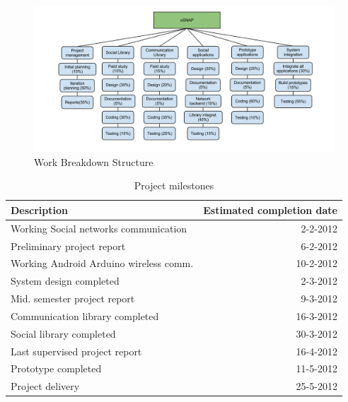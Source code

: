 \begin{figure}[h!]
\centering \includegraphics[width=1.1\textwidth]{img/mgmt-wbs.png} \caption{Work Breakdown Structure}
\label{fig:mgmt-wbs}
\end{figure}

\begin{table}[h!]
	\begin{tabular}{| l | r |}
		\hline

		\textbf{Description} & \textbf{Estimated completion date} \\
		\hline

		Working Social networks communication & 2-2-2012 \\
		\hline

		Preliminary project report & 6-2-2012 \\
		\hline

		Working Android Arduino wireless comm. & 10-2-2012 \\
		\hline

		System design completed & 2-3-2012 \\
		\hline

		Mid. semester project report & 9-3-2012 \\
		\hline

		Communication library completed & 16-3-2012 \\
		\hline

		Social library completed & 30-3-2012 \\
		\hline

		Last supervised project report & 16-4-2012 \\
		\hline

		Prototype completed & 11-5-2012 \\
		\hline

		Project delivery & 25-5-2012 \\
		\hline

	\end{tabular}
	\caption{Project milestones}
	\label{tbl:milestone}
\end{table}

